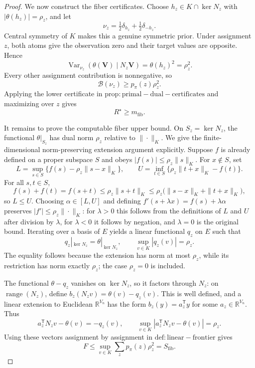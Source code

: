 \documentclass{article}
\begin{document}
\begin{proof}
We now construct the fiber certificates. Choose \(h_z\in K\cap\ker N_z\) with \(|\theta(h_z)|=\rho_z\), and let
\[
 \nu_z=\tfrac12\delta_{h_z}+\tfrac12\delta_{-h_z}.
\]
Central symmetry of \(K\) makes this a genuine symmetric prior. Under assignment \(z\), both atoms give the observation zero and their target values are opposite. Hence
\[
 \operatorname{Var}_{\nu_z}(\theta(\mathbf V)\mid N_z\mathbf V)
 =\theta(h_z)^2=\rho_z^2.
\]
Every other assignment contribution is nonnegative, so
\[
 \mathcal B(\nu_z)\ge p_{\pi}(z)\rho_z^2.
\]
Applying the lower certificate in \(\mathrm{prop:primal-dual-certificates}\) and maximizing over \(z\) gives
\[
 R^{\star}\ge m_{\mathrm{fib}}.
\]

It remains to prove the computable fiber upper bound. On \(S_z=\ker N_z\), the functional \(\theta|_{S_z}\) has dual norm \(\rho_z\) relative to \(\|\cdot\|_K\). We give the finite-dimensional norm-preserving extension argument explicitly. Suppose \(f\) is already defined on a proper subspace \(S\) and obeys \(|f(s)|\le\rho_z\|s\|_K\). For \(x\notin S\), set
\[
 L=\sup_{s\in S}\{f(s)-\rho_z\|s-x\|_K\},
 \qquad
 U=\inf_{t\in S}\{\rho_z\|t+x\|_K-f(t)\}.
\]
For all \(s,t\in S\),
\[
 f(s)+f(t)=f(s+t)
 \le\rho_z\|s+t\|_K
 \le\rho_z\bigl(\|s-x\|_K+\|t+x\|_K\bigr),
\]
so \(L\le U\). Choosing \(\alpha\in[L,U]\) and defining
\(
f'(s+\lambda x)=f(s)+\lambda\alpha
\)
preserves \(|f'|\le\rho_z\|\cdot\|_K\): for \(\lambda>0\) this follows from the definitions of \(L\) and \(U\) after division by \(\lambda\), for \(\lambda<0\) it follows by negation, and \(\lambda=0\) is the original bound. Iterating over a basis of \(E\) yields a linear functional \(q_z\) on \(E\) such that
\[
 q_z|_{\ker N_z}=\theta|_{\ker N_z},
 \qquad
 \sup_{v\in K}|q_z(v)|=\rho_z.
\]
The equality follows because the extension has norm at most \(\rho_z\), while its restriction has norm exactly \(\rho_z\); the case \(\rho_z=0\) is included.

The functional \(\theta-q_z\) vanishes on \(\ker N_z\), so it factors through \(N_z\): on \(\operatorname{range}(N_z)\), define \(b_z(N_zv)=\theta(v)-q_z(v)\). This is well defined, and a linear extension to Euclidean \(\mathbb R^{V_n}\) has the form \(b_z(y)=a_z^{\mathsf T}y\) for some \(a_z\in\mathbb R^{V_n}\). Thus
\[
 a_z^{\mathsf T}N_zv-\theta(v)=-q_z(v),
 \qquad
 \sup_{v\in K}|a_z^{\mathsf T}N_zv-\theta(v)|=\rho_z.
\]
Using these vectors assignment by assignment in \(\mathrm{def:linear-frontier}\) gives
\[
 F\le\sup_{v\in K}\sum_zp_{\pi}(z)\rho_z^2
 =S_{\mathrm{fib}}.
\]


\end{proof}
\end{document}
